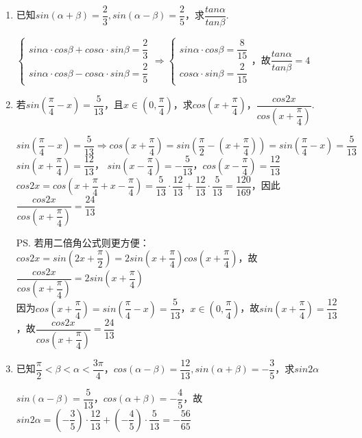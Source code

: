 \begin{enumerate}
    \item 已知$sin\left(\alpha + \beta\right) = \dfrac{2}{3}, sin\left(\alpha - \beta\right) = \dfrac{2}{5}$，求$\dfrac{tan\alpha}{tan\beta}$.
    \begin{jieda}
        $\left \{ \begin{array}{l}
             sin\alpha \cdot cos\beta + cos\alpha \cdot sin\beta = \dfrac{2}{3}  \\
             sin\alpha \cdot cos\beta - cos\alpha \cdot sin\beta = \dfrac{2}{5}
        \end{array} \right. \Rightarrow \left \{ \begin{array}{l}
             sin\alpha \cdot cos\beta = \dfrac{8}{15}  \\
             cos\alpha \cdot sin\beta = \dfrac{2}{15}
        \end{array} \right.$，故$\dfrac{tan\alpha}{tan\beta} = 4$
    \end{jieda}

    \item 若$sin\left(\dfrac{\pi}{4} - x\right) = \dfrac{5}{13}$，且$x \in \left(0, \dfrac{\pi}{4}\right)$，求$cos\left(x+\dfrac{\pi}{4}\right)$，$\dfrac{cos2x}{cos\left(x+\dfrac{\pi}{4}\right)}$.
    \begin{jieda}
        $sin\left(\dfrac{\pi}{4} - x\right) = \dfrac{5}{13} \Rightarrow cos\left(x+\dfrac{\pi}{4}\right) = sin\left(\dfrac{\pi}{2} - \left(x+\dfrac{\pi}{4}\right)\right) = sin\left(\dfrac{\pi}{4} - x\right) = \dfrac{5}{13}$ \\
        $sin\left(x+\dfrac{\pi}{4}\right) = \dfrac{12}{13}$，
        $sin\left(x-\dfrac{\pi}{4}\right) = -\dfrac{5}{13}$，$cos\left(x-\dfrac{\pi}{4}\right) = \dfrac{12}{13}$ \\
        $cos2x = cos\left(x+\dfrac{\pi}{4} + x - \dfrac{\pi}{4}\right) = \dfrac{5}{13} \cdot \dfrac{12}{13} + \dfrac{12}{13} \cdot \dfrac{5}{13} = \dfrac{120}{169} $，因此$\dfrac{cos2x}{cos\left(x+\dfrac{\pi}{4}\right)} = \dfrac{24}{13}$

        \ps 若用二倍角公式则更方便：\\
        $cos2x = sin(2x+\dfrac{\pi}{2}) = 2sin(x+\dfrac{\pi}{4})cos(x+\dfrac{\pi}{4})$，故$\dfrac{cos2x}{cos(x+\dfrac{\pi}{4})} = 2sin(x+\dfrac{\pi}{4})$ \\
        因为$cos(x+\dfrac{\pi}{4}) = sin(\dfrac{\pi}{4} - x) = \dfrac{5}{13}$，$x \in (0, \dfrac{\pi}{4})$，故$sin(x+\dfrac{\pi}{4}) = \dfrac{12}{13}$，故$\dfrac{cos2x}{cos(x+\dfrac{\pi}{4})} = \dfrac{24}{13}$
    \end{jieda}
    \item 已知$\dfrac{\pi}{2} <\beta < \alpha < \dfrac{3\pi}{4}$，$cos\left(\alpha - \beta\right) = \dfrac{12}{13}, sin\left(\alpha + \beta\right) = -\dfrac{3}{5}$，求$sin2\alpha$
    \begin{jieda}
        $sin\left(\alpha - \beta\right) = \dfrac{5}{13}$，$cos\left(\alpha + \beta\right) = -\dfrac{4}{5}$，故
        $sin2\alpha = \left(-\dfrac{3}{5}\right) \cdot \dfrac{12}{13} + \left(-\dfrac{4}{5}\right) \cdot \dfrac{5}{13} = -\dfrac{56}{65}$
    \end{jieda}
\end{enumerate}

